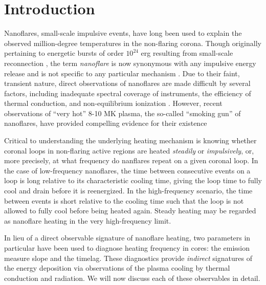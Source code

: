 \section{Introduction}\label{introduction}

Nanoflares, small-scale impulsive events, have long been used to explain the observed million-degree temperatures in the non-flaring corona. Though originally pertaining to energetic bursts of order $10^{24}$ erg resulting from small-scale reconnection \citep{parker_nanoflares_1988}, the term \textit{nanoflare} is now synonymous with any impulsive energy release and is not specific to any particular mechanism \citep{klimchuk_key_2015}. Due to their faint, transient nature, direct observations of nanoflares are made difficult by several factors, including inadequate spectral coverage of instruments, the efficiency of thermal conduction, and non-equilibrium ionization \citep{cargill_implications_1994,winebarger_defining_2012,barnes_inference_2016}. However, recent observations of ``very hot'' 8-10 MK plasma, the so-called ``smoking gun'' of nanoflares, have provided compelling evidence for their existence \citep[e.g.][]{brosius_pervasive_2014,caspi_new_2015,parenti_spectroscopy_2017,ishikawa_detection_2017}

Critical to understanding the underlying heating mechanism is knowing whether coronal loops in non-flaring active regions are heated \textit{steadily} or \textit{impulsively}, or, more precisely, at what frequency do nanflares repeat on a given coronal loop. In the case of low-frequency nanoflares, the time between consecutive events on a loop is long relative to its characteristic cooling time, giving the loop time to fully cool and drain before it is reenergized. In the high-frequency scenario, the time between events is short relative to the cooling time such that the loop is not allowed to fully cool before being heated again. Steady heating may be regarded as nanoflare heating in the very high-frequency limit.

In lieu of a direct observable signature of nanoflare heating, two parameters in particular have been used to diagnose heating frequency in \AR{} cores: the emission measure slope and the timelag. These diagnostics provide \textit{indirect} signatures of the energy deposition via observations of the plasma cooling by thermal conduction and radiation. We will now discuss each of these observables in detail.

